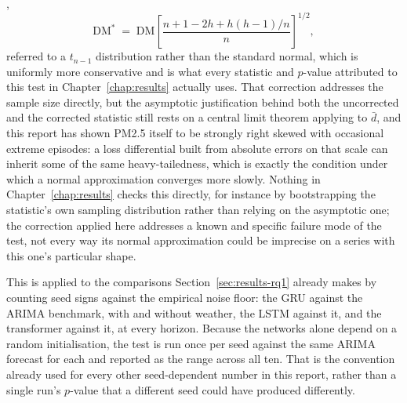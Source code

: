 \documentclass[12pt,a4paper]{report}
\begin{document}
\citet{harvey1997dmtest},
\begin{equation}
\mathrm{DM}^{*} \;=\; \mathrm{DM}\left[\frac{n+1-2h+h(h-1)/n}{n}\right]^{1/2},
\label{eq:dm-hln}
\end{equation}
referred to a $t_{n-1}$ distribution rather than the standard normal, which
is uniformly more conservative and is what every statistic and $p$-value
attributed to this test in Chapter~\ref{chap:results} actually uses.
That correction addresses the sample size directly, but the asymptotic
justification behind both the uncorrected and the corrected statistic
still rests on a central limit theorem applying to $\bar d$, and this
report has shown PM2.5 itself to be strongly right skewed with
occasional extreme episodes: a loss differential built from absolute
errors on that scale can inherit some of the same heavy-tailedness, which
is exactly the condition under which a normal approximation converges
more slowly. Nothing in Chapter~\ref{chap:results} checks this directly,
for instance by bootstrapping the statistic's own sampling distribution
rather than relying on the asymptotic one; the correction applied here
addresses a known and specific failure mode of the test, not every way
its normal approximation could be imprecise on a series with this one's
particular shape.

This is applied to the comparisons Section~\ref{sec:results-rq1}
already makes by counting seed signs against the empirical noise floor:
the GRU against the ARIMA benchmark, with and without weather, the LSTM
against it, and the transformer against it, at every horizon. Because the
networks alone depend on a random initialisation, the test is run once per
seed against the same ARIMA forecast for each and reported as the range
across all ten. That is the convention already used for every other
seed-dependent number in this report, rather than a single run's
$p$-value that a different seed could have produced differently.
\end{document}
